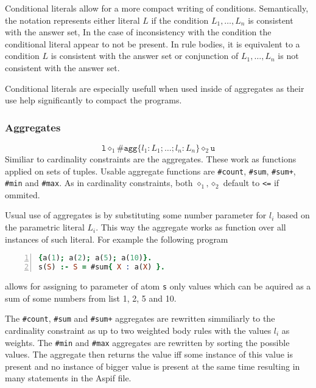 \documentclass[
    digital,
    color,
    oneside,
    sansbold,
    lot,
    nolof
]{fithesis}
\begin{document}
Conditional literals allow for a more compact writing of conditions.
Semantically, the notation represents either literal $L$ if the condition
$L_1, \dots, L_n$ is consistent with the answer set, In the case of inconsistency
with the condition the conditional literal appear to not be present.
In rule bodies, it is equivalent to a condition $L$ is consistent with the answer set
or conjunction of $L_1, \dots, L_n$ is not consistent with the answer set.

Conditional literals are especially usefull when used inside of aggregates as
their use help significantly to compact the programs.

\subsubsection{Aggregates}

\begin{equation*}
    \texttt{l} \diamond_1 \texttt{\#agg}\{ l_1: L_1; \dots; l_n: L_n\} \diamond_2 \texttt{u}
\end{equation*}
Similiar to cardinality constraints are the aggregates. These work as functions
applied on sets of tuples. Usable aggregate functions are \texttt{\#count},
\texttt{\#sum}, \texttt{\#sum+}, \texttt{\#min} and \texttt{\#max}.
As in cardinality constraints, both $\diamond_1, \diamond_2$ default to 
\texttt{<=} if ommited.

Usual use of aggregates is by substituting some number parameter for $l_i$
based on the parametric literal $L_i$. This way the aggregate works as function
over all instances of such literal. For example the following program
\begin{lstlisting}[language=prolog, numbers=left, countblanklines=false]
{a(1); a(2); a(5); a(10)}.
s(S) :- S = #sum{ X : a(X) }.
\end{lstlisting}
allows for assigning to parameter of atom \texttt{s} only values which can be
aquired as a sum of some numbers from list 1, 2, 5 and 10.

The \texttt{\#count}, \texttt{\#sum} and \texttt{\#sum+} aggregates are rewritten
simmiliarly to the cardinality constraint as up to two weighted body rules with
the values $l_i$ as weights. The \texttt{\#min} and \texttt{\#max} aggregates
are rewritten by sorting the possible values. The aggregate then returns the
value iff some instance of this value is present and no instance of bigger value
is present at the same time resulting in many statements in the Aspif file.
\end{document}
